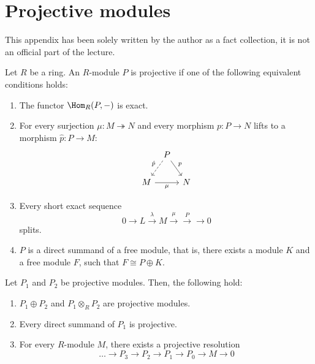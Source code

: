 \section{Projective modules}

\begin{editor}
  This appendix has been solely written by the author as a fact collection,
  it is not an official part of the lecture.
\end{editor}

\begin{definition}
  Let $R$ be a ring.
  An $R$-module $P$ is projective if one of the following equivalent
  conditions holds:
   \begin{enumerate}[p]
    \item The functor $\Hom_R(P, \dash)$ is exact.
    \item For every surjection $\mu \colon  M \twoheadrightarrow N$
      and every morphism $p\colon P \to N$ lifts to a morphism
      $\hat{p} \colon  P \to  M$:
      \[
      \begin{tikzcd}[column sep = tiny]
      & P \ar[swap,dashed]{dl}{\hat{p}} \ar{dr}{p} \\
      M \ar[swap]{rr}{\mu} & & N
      \end{tikzcd}
      \]
    \item Every short exact sequence
      \[
      0 \to  L \xrightarrow{λ} M \xrightarrow{\mu} \xrightarrow{P} \to 0
      \] 
      splits.
    \item $P$ is a direct summand of a free module,
      that is, there exists a module $K$ and a free module  $F$,
      such that  $F \cong P \oplus K$.
  \end{enumerate}
\end{definition}

\begin{lemma}
  \label{lm:facts-projective-modules}
  Let $P_1$ and $P_2$ be projective modules.
  Then, the following hold:
  \begin{enumerate}[h]
    \item
      $P_1 \oplus P_2$ and $P_1 \otimes _R P_2$
      are projective modules.
    \item Every direct summand of $P_1$ is projective.
    \item For every $R$-module  $M$, there exists a projective resolution
       \[
      \ldots \to P_3 \to P_2 \to P_1 \to P_0 \to  M \to  0
      \] 
  \end{enumerate}
\end{lemma}

